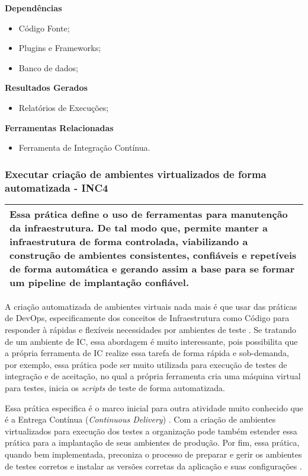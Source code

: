 \textbf{Dependências}
\begin{itemize}
    \item Código Fonte;
    \item Plugins e Frameworks;
    \item Banco de dados;
\end{itemize}

\textbf{ Resultados Gerados}
\begin{itemize}
    \item Relatórios de Execuções;
\end{itemize}

\textbf{ Ferramentas Relacionadas}
\begin{itemize}
    \item Ferramenta de Integração Contínua.
\end{itemize}

\subsubsection{Executar criação de ambientes virtualizados de forma automatizada - INC4}
\label{sec:inc4}

\begin{table}[H]
\centering
\begin{tabular}{|p{130mm}|}
\hline
Essa prática define o uso de ferramentas para manutenção da infraestrutura. De tal modo que, permite manter a infraestrutura de forma controlada, viabilizando a construção de ambientes consistentes, confiáveis e repetíveis de forma automática e gerando assim a base para se formar um pipeline de implantação confiável.\\ 
\hline
\end{tabular}
\end{table}

A criação automatizada de ambientes virtuais nada mais é que usar das práticas de DevOps, especificamente dos conceitos de Infraestrutura como Código para responder à rápidas e flexíveis necessidades por ambientes de teste \cite{BRAGA2015}. Se tratando de um ambiente de IC, essa abordagem é muito interessante, pois possibilita que a própria ferramenta de IC realize essa tarefa de forma rápida e sob-demanda, por exemplo, essa prática pode ser muito utilizada para execução de testes de integração e de aceitação, no qual a própria ferramenta cria uma máquina virtual para testes, inicia os \textit{scripts} de teste de forma automatizada.

Essa prática especifica é o marco inicial para outra atividade muito conhecido que é a Entrega Contínua (\textit{Continuous Delivery}) \cite{WOOTTON2013}. Com a criação de ambientes virtualizados para execução dos testes a organização pode também estender essa prática para a implantação de seus ambientes de produção. Por fim, essa prática, quando bem implementada, preconiza o processo de preparar e gerir os ambientes de testes corretos e instalar as versões corretas da aplicação e suas configurações \cite{humble2010}.

